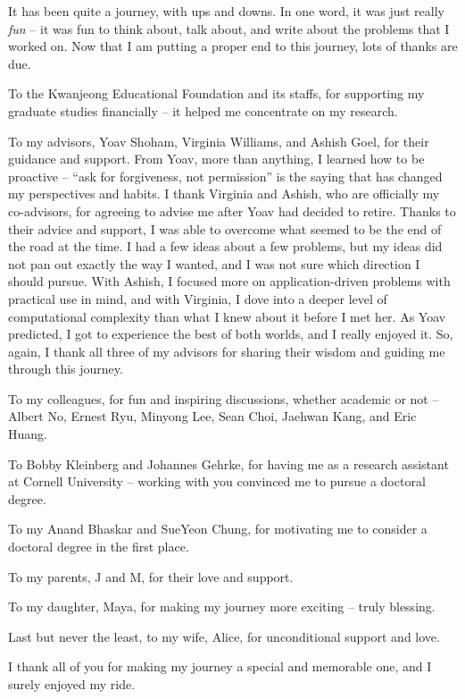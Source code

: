 It has been quite a journey, with ups and downs.
In one word, it was just really {\em fun} -- it was fun to think about, talk about, and write about the problems that I worked on. 
Now that I am putting a proper end to this journey, lots of thanks are due. 

To the Kwanjeong Educational Foundation and its staffs, for supporting my graduate studies financially -- it helped me concentrate on my research.

To my advisors, Yoav Shoham, Virginia Williams, and Ashish Goel, for their guidance and support. From Yoav, more than anything, I learned how to be proactive -- ``ask for forgiveness, not permission'' is the saying that has changed my perspectives and habits. I thank Virginia and Ashish, who are officially my co-advisors, for agreeing to advise me after Yoav had decided to retire. Thanks to their advice and support, I was able to overcome what seemed to be the end of the road at the time. I had a few ideas about a few problems, but my ideas did not pan out exactly the way I wanted, and I was not sure which direction I should pursue. With Ashish, I focused more on application-driven problems with practical use in mind, and with Virginia, I dove into a deeper level of computational complexity than what I knew about it before I met her. As Yoav predicted, I got to experience the best of both worlds, and I really enjoyed it. So, again, I thank all three of my advisors for sharing their wisdom and guiding me through this journey.



To my colleagues, for fun and inspiring discussions, whether academic or not -- Albert No, Ernest Ryu, Minyong Lee, Sean Choi, Jaehwan Kang, and Eric Huang. 


To Bobby Kleinberg and Johannes Gehrke, for having me as a research assistant at Cornell University -- working with you convinced me to pursue a doctoral degree.

To my Anand Bhaskar and SueYeon Chung, for motivating me to consider a doctoral degree in the first place.

To my parents, J and M, for their love and support.

To my daughter, Maya, for making my journey more exciting -- truly blessing.

Last but never the least, to my wife, Alice, for unconditional support and love.

I thank all of you for making my journey a special and memorable one, and I surely enjoyed my ride.


